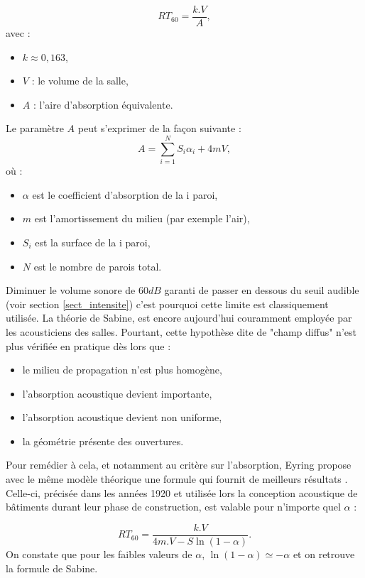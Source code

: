 \begin{equation}
   	RT_{60} = \frac{k.V}{A},
\end{equation}
avec :
\begin{itemize}
\item $k \approx 0,163$,
\item $V$ : le volume de la salle,
\item $A$ : l'aire d'absorption équivalente.
\end{itemize}
%
Le paramètre $A$ peut s'exprimer de la façon suivante :
\begin{equation*}
   	A = \sum_{i=1}^N S_{i}\alpha_{i} + 4mV,
\end{equation*}
où :
\begin{itemize}
\item $\alpha$ est le coefficient d'absorption de la i paroi,
\item $m$ est l'amortissement du milieu (par exemple l'air),
\item $S_{i}$ est la surface de la i paroi,
\item $N$ est le nombre de parois total.
\end{itemize}
%
Diminuer le volume sonore de $60dB$ garanti de passer en dessous du seuil audible (voir section \ref{sect_intensite}) c'est pourquoi cette limite est classiquement utilisée. La théorie de Sabine, est encore aujourd'hui couramment employée par les acousticiens des salles. Pourtant, cette hypothèse dite de "champ diffus" n’est plus vérifiée en pratique dès lors que :
\begin{itemize}
\item le milieu de propagation n’est plus homogène,
\item l’absorption acoustique devient importante,
\item l’absorption acoustique devient non uniforme,
\item la géométrie présente des ouvertures.
\end{itemize}
Pour remédier à cela, et notamment au critère sur l'absorption, Eyring propose avec le même modèle théorique une formule qui fournit de meilleurs résultats \cite[p. 217-241]{eyring}. Celle-ci, précisée dans les années 1920 et utilisée lors la conception acoustique de bâtiments durant leur phase de construction, est valable pour n'importe quel $\alpha$ :

\begin{equation}
   	RT_{60} = \frac{k.V}{4m.V - S\ln{(1-\alpha)}}.
\end{equation}
%
On constate que pour les faibles valeurs de $\alpha$, $\ln{(1-\alpha)} \simeq -\alpha$ et on retrouve la formule de Sabine.
 
